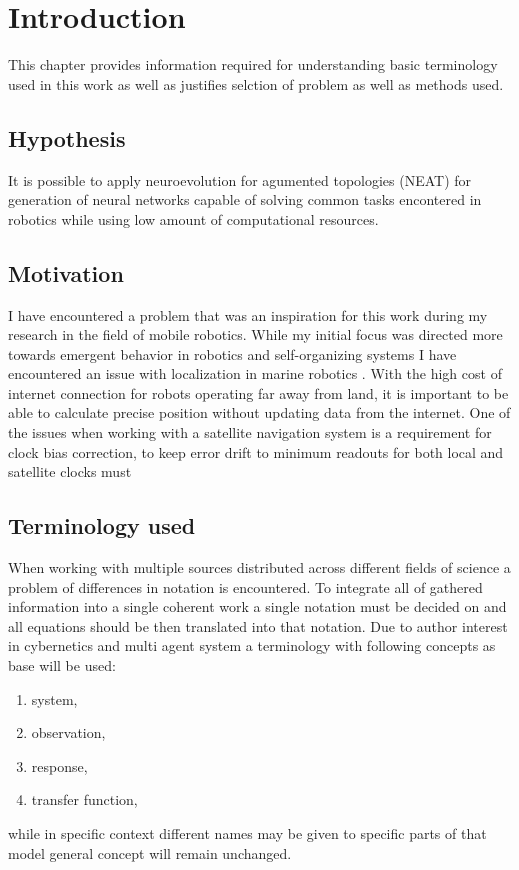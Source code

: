 \chapter{Introduction}
This chapter provides information required for understanding basic terminology used in this
work as well as justifies selction of problem as well as methods used.

\FloatBarrier
\section{Hypothesis}
It is possible to apply neuroevolution for agumented topologies (NEAT) for generation of neural 
networks capable of solving common tasks encontered in robotics while using low amount of 
computational resources.


\FloatBarrier
\section{Motivation}
I have encountered a problem that was an inspiration for this work during my research in the 
field of mobile robotics.
While my initial focus was directed more towards emergent behavior in robotics and self-organizing 
systems \cite{Gnys2017}\cite{Gnys2019} I have encountered an issue with localization in marine 
robotics \cite{Cabrera-Gamez2014}.
With the high cost of internet connection for robots operating far away from land, 
it is important to be able to calculate precise position without updating data from the internet.
One of the issues when working with a satellite navigation system is a requirement for clock bias
correction, to keep error drift to minimum readouts for both local and satellite clocks must

\FloatBarrier
\section{Terminology used}
When working with multiple sources distributed across different fields of science a problem of 
differences in notation is encountered. To integrate all of gathered information into a single 
coherent work a single notation must be decided on and all equations should be then translated
into that notation.
Due to author interest in cybernetics and multi agent system a terminology with following 
concepts as base will be used:
\begin{enumerate}
	\item system,
	\item observation,
	\item response,
	\item transfer function,
\end{enumerate}
while in specific context different names may be given to specific parts of that model general
concept will remain unchanged.

